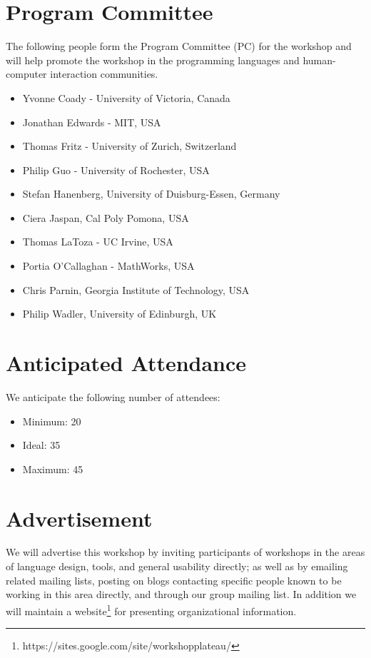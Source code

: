 \documentclass{sigplanconf}
\begin{document}
\section{Program Committee}

The following people form the Program Committee (PC) for the workshop and will help promote the workshop in the programming languages and human-computer interaction communities.

\begin{itemize}
\item Yvonne Coady - University of Victoria, Canada
\item Jonathan Edwards - MIT, USA
\item Thomas Fritz - University of Zurich, Switzerland
\item Philip Guo - University of Rochester, USA
\item Stefan Hanenberg, University of Duisburg-Essen, Germany
\item Ciera Jaspan, Cal Poly Pomona, USA
\item Thomas LaToza - UC Irvine, USA
\item Portia O'Callaghan - MathWorks, USA
\item Chris Parnin, Georgia Institute of Technology, USA
\item Philip Wadler, University of Edinburgh, UK
\end{itemize}


\section{Anticipated Attendance}

We anticipate the following number of attendees:

\begin{itemize}
\item Minimum: 20 
\item Ideal: 35
\item Maximum: 45 
\end{itemize}

\section{Advertisement}

We will advertise this workshop by inviting participants of workshops
in the areas of language design, tools, and general usability
directly; as well as by emailing related mailing lists, posting on
blogs contacting specific people known to be working in this area directly,
and through our group mailing list. In addition we will maintain a website\footnote{https://sites.google.com/site/workshopplateau/} for presenting organizational information.
\end{document}
